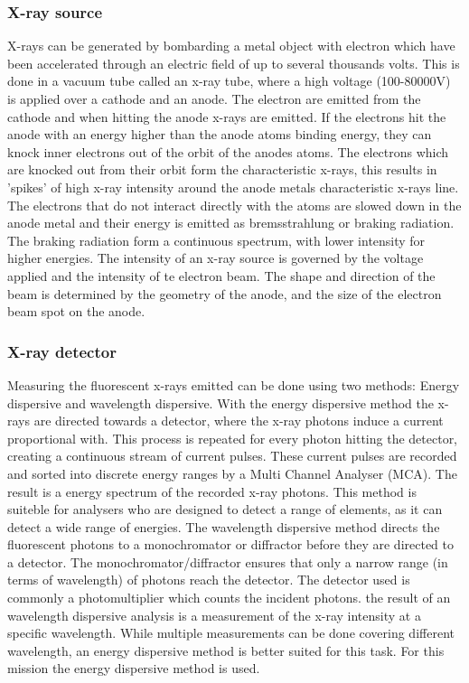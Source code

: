 \subsubsection{X-ray source}
X-rays can be generated by bombarding a metal object with electron which have been accelerated through an electric field of up to several thousands volts. This is done in a vacuum tube called an x-ray tube, where a high voltage (100-80000V) is applied over a cathode and an anode. The electron are emitted from the cathode and when hitting the anode x-rays are emitted. If the electrons hit the anode with an energy higher than the anode atoms binding energy, they can knock inner electrons out of the orbit of the anodes atoms. The electrons which are knocked out from their orbit form the characteristic x-rays, this results in 'spikes' of high x-ray intensity around the anode metals characteristic x-rays line.
The electrons that do not interact directly with the atoms are slowed down in the anode metal and their energy is emitted as bremsstrahlung or braking radiation. The braking radiation form a continuous spectrum, with lower intensity for higher energies.
The intensity of an x-ray source is governed by the voltage applied and the intensity of te electron beam. The shape and direction of the beam is determined by the geometry of the anode, and the size of the electron beam spot on the anode.


\subsubsection{X-ray detector}
Measuring the fluorescent x-rays emitted can be done using two methods: Energy dispersive and wavelength dispersive. 
With the energy dispersive method the x-rays are directed towards a detector, where the x-ray photons induce a current proportional with. This process is repeated for every photon hitting the detector, creating a continuous stream of current pulses. These current pulses are recorded and sorted into discrete energy ranges by a Multi Channel Analyser (MCA). The result is a energy spectrum of the recorded x-ray photons. This method is suiteble for analysers who are designed to detect a range of elements, as it can detect a wide range of energies.
The wavelength dispersive method directs the fluorescent photons to a monochromator or diffractor before they are directed to a detector. The monochromator/diffractor ensures that only a narrow range (in terms of wavelength) of photons reach the detector. The detector used is commonly a photomultiplier which counts the incident photons. the result of an wavelength dispersive analysis is a measurement of the x-ray intensity at a specific wavelength. While multiple measurements can be done covering different wavelength, an energy dispersive method is better suited for this task.
For this mission the energy dispersive method is used.

